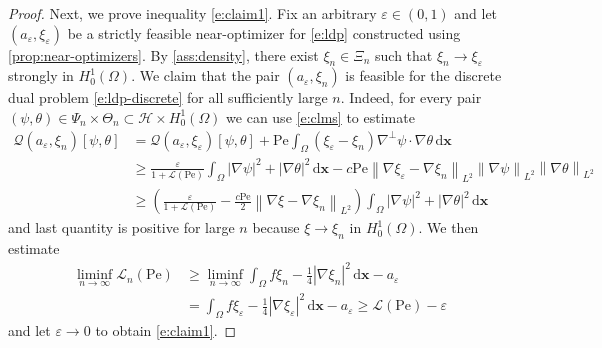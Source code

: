 \documentclass[a4paper, 10pt]{amsart}
\numberwithin{equation}{section}
\theoremstyle{plain}
\theoremstyle{definition}
\theoremstyle{remark}
\newcommand{\cal}[1]{\mathcal{#1}}
\newcommand{\Pe}{\mathrm{Pe}}
\newcommand{\Hoz}{H_0^1(\Omega)}
\newcommand{\QF}{\mathcal{Q}}
\newcommand{\cost}[2]{\avg{f#1 - \frac14 \abs{\nabla #1}^2} - #2}
\renewcommand{\vec}[1]{\mathbf{#1}}
\newcommand{\abs}[1]{\left\vert #1 \right\vert}
\newcommand{\dx}{\mathrm{d} \vec{x}}
\newcommand{\avg}[1]{\int_\Omega #1 \,\dx}
\newcommand{\norm}[1]{\left\| #1 \right\|}
\newcommand{\lb}{\mathcal{L}}
\begin{document}
\begin{proof}
Next, we prove inequality \cref{e:claim1}. Fix an arbitrary $\varepsilon \in (0,1)$ and let $(a_\varepsilon,\xi_\varepsilon)$ be a strictly feasible near-optimizer for \cref{e:ldp} constructed using \cref{prop:near-optimizers}. By \cref{ass:density}, there exist $\xi_n \in \Xi_n$ such that $\xi_n \to \xi_\varepsilon$ strongly in $\Hoz$. We claim that the pair $(a_\varepsilon, \xi_n)$ is feasible for the discrete dual problem \cref{e:ldp-discrete} for all sufficiently large $n$. Indeed, for every pair $(\psi,\theta) \in \Psi_n \times \Theta_n \subset \cal{H}\times \Hoz$ we can use \cref{e:clms} to estimate
\begin{align*}
    \QF(a_\varepsilon, \xi_n)[\psi,\theta] 
    &= \QF(a_\varepsilon, \xi_\varepsilon)[\psi,\theta] + \Pe \avg{(\xi_\varepsilon-\xi_n) \nabla^\perp \psi \cdot \nabla\theta}
    \\
    &\geq \frac{\varepsilon}{1+\mathcal{L(\Pe)}} \avg{\abs{\nabla\psi}^2 + \abs{\nabla\theta}^2} - 
    c \Pe \norm{\nabla \xi_\varepsilon - \nabla \xi_n}_{L^2} \norm{\nabla \psi}_{L^2} \norm{\nabla\theta}_{L^2}
    \\
    &\geq \left(\frac{\varepsilon}{1+\mathcal{L(\Pe)}} - \frac{c\Pe}{2} \norm{\nabla \xi- \nabla \xi_n}_{L^2} \right)\avg{\abs{\nabla\psi}^2 + \abs{\nabla\theta}^2}
\end{align*}
and last quantity is positive for large $n$ because $\xi \to \xi_n$ in $\Hoz$. We then estimate
\begin{align*}
    \liminf_{n \to \infty}\lb_n(\Pe)
    &\geq \liminf_{n \to \infty} \cost{\xi_n}{a_\varepsilon} 
    \\
    &= \cost{\xi_\varepsilon}{a_\varepsilon}
    \geq \lb(\Pe) - \varepsilon
\end{align*}
and let $\varepsilon \to 0$ to obtain \cref{e:claim1}.


\end{proof}
\end{document}
